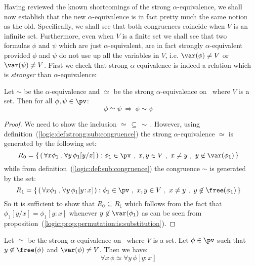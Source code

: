 Having reviewed the known shortcomings of the strong 
$\alpha$-equivalence, we shall now establish that the new $\alpha$-equivalence 
is in fact pretty much the same notion as the old.
Specifically, we shall see that both congruences coincide when $V$
is an infinite set. Furthermore, even when $V$ is a finite set we
shall see that two formulas $\phi$ and $\psi$ which are just
$\alpha$-equivalent, are in fact strongly $\alpha$-equivalent 
provided $\phi$ and $\psi$ do not use up all the variables in $V$, i.e. 
$\var(\phi)\neq V$ or $\var(\psi)\neq V$.
First we check that strong $\alpha$-equivalence is indeed a
relation which is {\em stronger} than $\alpha$-equivalence:

\begin{prop}\label{logic:prop:strong:implies:quant}
Let $\sim$ be the $\alpha$-equivalence and $\simeq$ be the strong
$\alpha$-equivalence on \pv\ where $V$ is a set. Then for all
$\phi,\psi\in\pv$:
    \[
    \phi\simeq\psi\ \Rightarrow\ \phi\sim\psi
    \]
\end{prop}

\noindent
\begin{proof}
We need to show the inclusion $\simeq\,\subseteq\,\sim$\,. However,
using definition~(\ref{logic:def:strong:sub:congruence}) the strong 
$\alpha$-equivalence $\simeq$ is generated by the following set:
    \[
    R_{0}=\left\{\,(\,\forall x\phi_{1}\,,\,\forall
    y\,\phi_{1}[y/x]\,):\phi_{1}\in\pv\ ,\ x,y\in V\ ,\ x\neq y\ ,\
    y\not\in\var(\phi_{1})\,\right\}
    \]
while from definition~(\ref{logic:def:sub:congruence}) the
congruence $\sim$ is generated by the set:
     \[
    R_{1}=\left\{\,(\,\forall x\phi_{1}\,,\,\forall y\,\phi_{1}[y\!:\!x]\,):
    \phi_{1}\in\pv\ ,\ x,y\in V\ ,\ x\neq y\ ,\ y\not\in\free(\phi_{1})\,\right\}
    \]
So it is sufficient to show that $R_{0}\subseteq R_{1}$ which
follows from the fact that $\phi_{1}[y/x]=\phi_{1}[y\!:\!x]$
whenever $y\not\in\var(\phi_{1})$ as can be seen from
proposition~(\ref{logic:prop:permutation:is:substitution}).
\end{proof}


\begin{prop}\label{logic:prop:link:strong:sub:congruence}
Let $\simeq$ be the strong $\alpha$-equivalence on \pv\ where $V$
is a set. Let $\phi\in\pv$ such that $y\not\in\free(\phi)$ and
$\var(\phi)\neq V$. Then we have:
    \[
    \forall x\,\phi\simeq\forall y\,\phi[y\!:\!x]
    \]
\end{prop}

